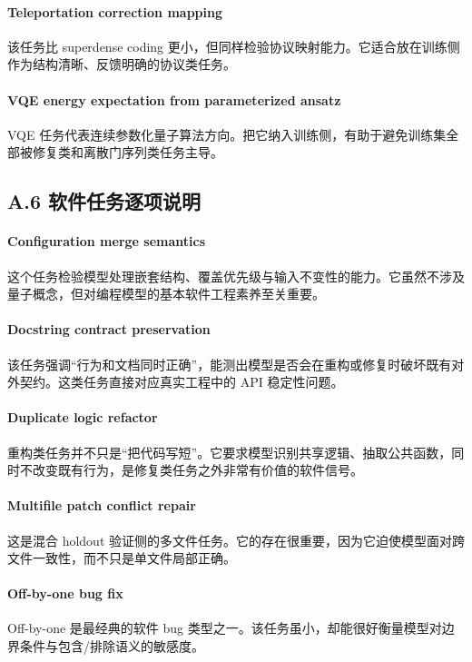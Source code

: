 \documentclass[11pt,a4paper]{article}
\begin{document}
\paragraph{Teleportation correction mapping}
该任务比 superdense coding 更小，但同样检验协议映射能力。它适合放在训练侧作为结构清晰、反馈明确的协议类任务。

\paragraph{VQE energy expectation from parameterized ansatz}
VQE 任务代表连续参数化量子算法方向。把它纳入训练侧，有助于避免训练集全部被修复类和离散门序列类任务主导。

\subsection{A.6 软件任务逐项说明}

\paragraph{Configuration merge semantics}
这个任务检验模型处理嵌套结构、覆盖优先级与输入不变性的能力。它虽然不涉及量子概念，但对编程模型的基本软件工程素养至关重要。

\paragraph{Docstring contract preservation}
该任务强调“行为和文档同时正确”，能测出模型是否会在重构或修复时破坏既有对外契约。这类任务直接对应真实工程中的 API 稳定性问题。

\paragraph{Duplicate logic refactor}
重构类任务并不只是“把代码写短”。它要求模型识别共享逻辑、抽取公共函数，同时不改变既有行为，是修复类任务之外非常有价值的软件信号。

\paragraph{Multifile patch conflict repair}
这是混合 holdout 验证侧的多文件任务。它的存在很重要，因为它迫使模型面对跨文件一致性，而不只是单文件局部正确。

\paragraph{Off-by-one bug fix}
Off-by-one 是最经典的软件 bug 类型之一。该任务虽小，却能很好衡量模型对边界条件与包含/排除语义的敏感度。
\end{document}
